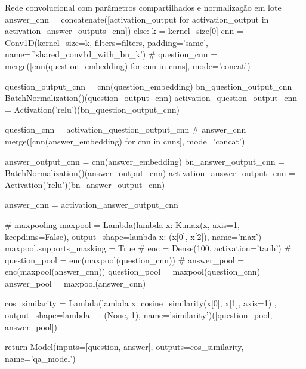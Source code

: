 \begin{mypython-linenumber}{Rede convolucional com parâmetros compartilhados e normalização em lote}
            answer_cnn = concatenate([activation_output for activation_output in activation_answer_outputs_cnn])
        else:
            k = kernel_size[0]
            cnn = Conv1D(kernel_size=k,
                           filters=filters,
                           padding='same',
                           name=f'shared_conv1d_with_bn_{k}')
            # question_cnn = merge([cnn(question_embedding) for cnn in cnns], mode='concat')

            question_output_cnn = cnn(question_embedding)
            bn_question_output_cnn = BatchNormalization()(question_output_cnn)
            activation_question_output_cnn = Activation('relu')(bn_question_output_cnn)

            question_cnn = activation_question_output_cnn
            # answer_cnn = merge([cnn(answer_embedding) for cnn in cnns], mode='concat')

            answer_output_cnn = cnn(answer_embedding)
            bn_answer_output_cnn = BatchNormalization()(answer_output_cnn)
            activation_answer_output_cnn = Activation('relu')(bn_answer_output_cnn)

            answer_cnn = activation_answer_output_cnn

        # maxpooling
        maxpool = Lambda(lambda x: K.max(x, axis=1, keepdims=False), output_shape=lambda x: (x[0], x[2]),
                         name='max')
        maxpool.supports_masking = True
        # enc = Dense(100, activation='tanh')
        # question_pool = enc(maxpool(question_cnn))
        # answer_pool = enc(maxpool(answer_cnn))
        question_pool = maxpool(question_cnn)
        answer_pool = maxpool(answer_cnn)

        cos_similarity = Lambda(lambda x: cosine_similarity(x[0], x[1], axis=1)
                                       , output_shape=lambda _: (None, 1), name='similarity')([question_pool,
                                                                                               answer_pool])

        

        return Model(inputs=[question, answer], outputs=cos_similarity,
                                   name='qa_model')
\end{mypython-linenumber}

